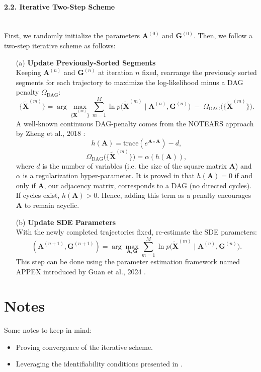 \documentclass[a4paper, 11pt]{article}
\begin{document}
\begin{sloppypar}
\paragraph{2.2. Iterative Two-Step Scheme} \mbox{}\\
First, we randomly initialize the parameters
$\mathbf{A}^{(0)}$ and $\mathbf{G}^{(0)}$. Then, we follow a two-step
iterative scheme as follows:
\begin{enumerate}
  \item[(a)] \textbf{Update Previously-Sorted Segments} \\
    Keeping $\mathbf{A}^{(n)}$ and $\mathbf{G}^{(n)}$ at iteration $n$ fixed, rearrange the
    previously sorted segments for each trajectory to maximize the log-likelihood minus a
    DAG penalty $\Omega_{\mathrm{DAG}}$:
    \[
    \{\widetilde{\mathbf{X}}^{(m)}\}
    = 
    \arg\max_{\{\widetilde{\mathbf{X}}^{(m)}\}}
    \sum_{m=1}^M
    \ln p\bigl(\widetilde{\mathbf{X}}^{(m)} \mid \mathbf{A}^{(n)}, \mathbf{G}^{(n)}\bigr)
    \;-\; 
    \Omega_{\mathrm{DAG}}\bigl(\{\widetilde{\mathbf{X}}^{(m)}\}\bigr).
    \]
    A well-known continuous DAG-penalty comes from the NOTEARS approach by
    Zheng et al., 2018 \cite{zheng2018dagstearscontinuousoptimization}:
    \[
    h(\mathbf{A})
    = \text{trace}(e^{\mathbf{A} \circ \mathbf{A}})-d,
    \]
    \[
    \Omega_{\mathrm{DAG}}\bigl(\{\widetilde{\mathbf{X}}^{(m)}\}\bigr)
    = \alpha (h(\mathbf{A})),
    \]
    where $d$ is the number of variables (i.e. the size of the square matrix
    $\mathbf{A}$) and $\alpha$ is a regularization hyper-parameter.
    It is proved in \cite{zheng2018dagstearscontinuousoptimization} that
    $h(\mathbf{A}) = 0$ if and only if $\mathbf{A}$,
    our adjacency matrix, corresponds to a DAG (no directed cycles). If cycles exist,
    $h(\mathbf{A}) > 0$. Hence, adding this term as a penalty encourages $\mathbf{A}$
    to remain acyclic.
  \item[(b)] \textbf{Update SDE Parameters} \\
    With the newly completed trajectories fixed, re-estimate the SDE parameters:
    \[
    (\mathbf{A}^{(n+1)}, \mathbf{G}^{(n+1)}) 
    = 
    \arg\max_{\mathbf{A}, \mathbf{G}}
    \sum_{m=1}^M
    \ln p\bigl(\widetilde{\mathbf{X}}^{(m)} \mid \mathbf{A}^{(n)}, \mathbf{G}^{(n)}\bigr).
    \]
    This step can be done using the parameter estimation framework named APPEX introduced
    by Guan et al., 2024 \cite{guan2024identifyingdriftdiffusioncausal}.
  \end{enumerate}

\section{Notes}\label{s:3}
Some notes to keep in mind:
\begin{itemize}
  \item Proving convergence of the iterative scheme.
  \item Leveraging the identifiability conditions presented in \cite{guan2024identifyingdriftdiffusioncausal}.
\end{itemize}





\end{sloppypar}
\end{document}
